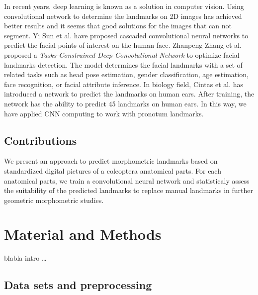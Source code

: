 \documentclass[review]{elsarticle}
\begin{document}
In recent years, deep learning is known as a solution in computer vision. Using convolutional network to determine the landmarks on 2D images has achieved better results and it seems that good solutions for the images that can not segment. Yi Sun et al. \cite{sun2013deep} have proposed cascaded convolutional neural networks to predict the facial points of interest on the human face.
Zhanpeng Zhang et al. \cite{zhang2014facial} proposed a \textit{Tasks-Constrained Deep Convolutional Network} to optimize facial landmarks detection. The model determines the facial landmarks with a set of related tasks such as head pose estimation, gender classification, age estimation, face recognition, or facial attribute inference. In biology field, Cintas et al. \cite{cintas2016automatic} has introduced a network to predict the landmarks on human ears. After training, the network has the ability to predict 45 landmarks on human ears. In this way, we have applied CNN computing to work with pronotum landmarks.

\subsection{Contributions}

We present an approach to predict morphometric landmarks based on standardized digital pictures of a coleoptera anatomical parts. For each anatomical parts, we train a convolutional neural network and statisticaly assess the suitability of the predicted landmarks to replace manual landmarks in further geometric morphometric studies.

\section{Material and Methods}

blabla intro \ldots \\

\subsection{Data sets and preprocessing}
\end{document}
